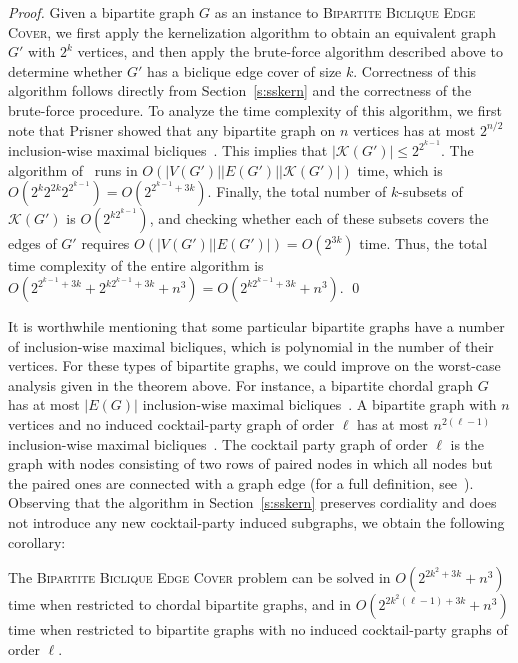 \begin{proof}
Given a bipartite graph $G$ as an instance to \textsc{Bipartite
Biclique Edge Cover}, we first apply the kernelization algorithm
to obtain an equivalent graph $G'$ with $2^k$ vertices, and then apply the brute-force algorithm
described above to determine whether $G'$ has a biclique edge
cover of size $k$. Correctness of this algorithm follows
directly from Section~\ref{s:sskern} and the correctness of
the brute-force procedure. To analyze the time complexity of
this algorithm, we first note that Prisner showed that any
bipartite graph on $n$ vertices has at most $2^{n/2}$
inclusion-wise maximal
bicliques~\cite{TsukiyamaIdeAriyoshiShirakawa1977}. This
implies that $|\mathcal{K}(G')|  \leq 2^{2^{k-1}}$. The
algorithm of~\cite{Prisner2000} runs in
$O(|V(G')||E(G')||\mathcal{K}(G')|)$ time, which is
$O(2^k2^{2k}2^{2^{k-1}})=O(2^{2^{k-1}+3k})$. Finally, the total
number of $k$-subsets of $\mathcal{K}(G')$ is
$O(2^{k2^{k-1}})$, and checking whether each of these subsets
covers the edges of $G'$ requires $O(|V(G')||E(G')|)=O(2^{3k})$
time. Thus, the total time complexity of the entire algorithm
is $O(2^{2^{k-1}+3k} + 2^{k2^{k-1}+3k} + n^3) =
O(2^{k2^{k-1}+3k} + n^3).$ \qed
\end{proof}

It is worthwhile mentioning that some particular bipartite
graphs have a number of inclusion-wise maximal bicliques, which
is polynomial in the number of their vertices. For these types
of bipartite graphs, we could improve on the worst-case analysis
given in the theorem above. For instance, a bipartite chordal
graph $G$ has at most $|E(G)|$ inclusion-wise maximal
bicliques~\cite{TsukiyamaIdeAriyoshiShirakawa1977}. A bipartite
graph with $n$ vertices and no induced cocktail-party graph of
order $\ell$ has at
most $n^{2(\ell-1)}$ inclusion-wise maximal
bicliques~\cite{Prisner2000}. The cocktail party graph of order $\ell$
is the graph with nodes consisting of two rows of paired nodes in which all nodes but the paired ones are connected with a graph edge
(for a full definition, see~\cite{Prisner2000}). Observing that the algorithm in
Section~\ref{s:sskern} preserves cordiality and does not
introduce any new cocktail-party induced subgraphs, we obtain
the following corollary:

\begin{corollary}
The \textsc{Bipartite Biclique Edge Cover} problem can be
solved in $O(2^{2k^2+3k} + n^3)$ time when restricted to
chordal bipartite graphs, and in $O(2^{2k^2(\ell-1)+3k} + n^3)$
time when restricted to bipartite graphs with no induced
cocktail-party graphs of order $\ell$.
\end{corollary}
